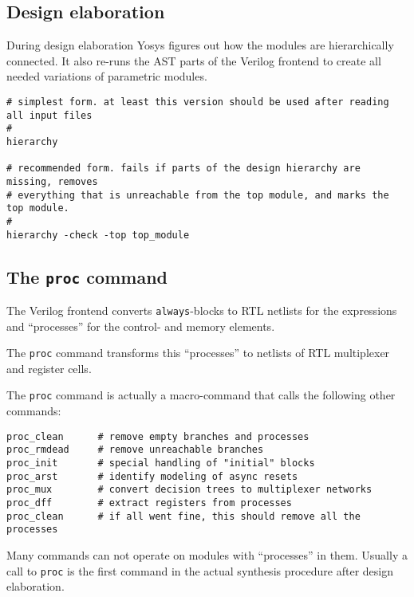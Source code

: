 
\subsection{Design elaboration}

\begin{frame}[fragile]{\subsecname}
During design elaboration Yosys figures out how the modules are hierarchically
connected. It also re-runs the AST parts of the Verilog frontend to create
all needed variations of parametric modules.

\bigskip
\begin{lstlisting}[xleftmargin=0.5cm, basicstyle=\ttfamily\fontsize{8pt}{10pt}\selectfont, language=ys]
# simplest form. at least this version should be used after reading all input files
#
hierarchy

# recommended form. fails if parts of the design hierarchy are missing, removes
# everything that is unreachable from the top module, and marks the top module.
#
hierarchy -check -top top_module
\end{lstlisting}
\end{frame}


\subsection{The {\tt proc} command}

\begin{frame}[fragile]{\subsecname}
The Verilog frontend converts {\tt always}-blocks to RTL netlists for the
expressions and ``processes'' for the control- and memory elements.

\medskip
The {\tt proc} command transforms this ``processes'' to netlists of RTL
multiplexer and register cells.

\medskip
The {\tt proc} command is actually a macro-command that calls the following
other commands:

\begin{lstlisting}[xleftmargin=0.5cm, basicstyle=\ttfamily\fontsize{8pt}{10pt}\selectfont, language=ys]
proc_clean      # remove empty branches and processes
proc_rmdead     # remove unreachable branches
proc_init       # special handling of "initial" blocks
proc_arst       # identify modeling of async resets
proc_mux        # convert decision trees to multiplexer networks
proc_dff        # extract registers from processes
proc_clean      # if all went fine, this should remove all the processes
\end{lstlisting}

\medskip
Many commands can not operate on modules with ``processes'' in them. Usually
a call to {\tt proc} is the first command in the actual synthesis procedure
after design elaboration.
\end{frame}

